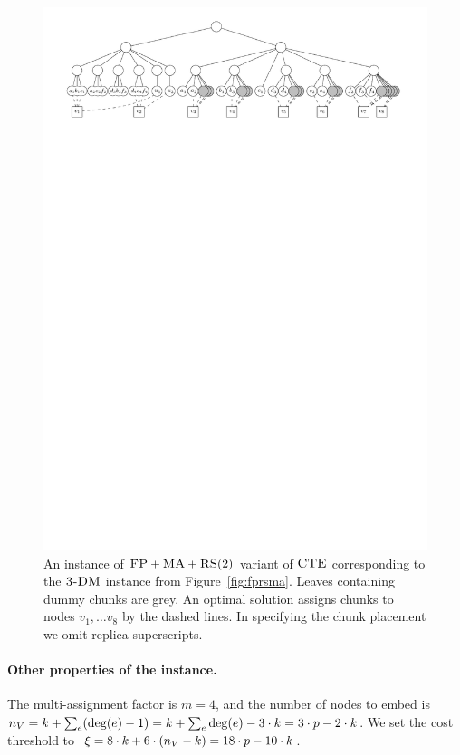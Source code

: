 \begin{figure}[t]
\centering
\includegraphics[width=1\columnwidth]{figs/static-mapping/cte-ma2.pdf}
\caption{An instance of $\textsc{FP}+\textsc{MA}+\textsc{RS}(2)$ variant of $\textsc{CTE}$ corresponding to the $\textsc{3-DM}$ instance from Figure~\ref{fig:fprsma}. Leaves containing dummy chunks are grey. An optimal solution assigns chunks to nodes $v_1, \ldots v_8$ by the dashed lines. In specifying the chunk placement we omit replica superscripts.}
\label{fig:example-rs2}
\end{figure}


\paragraph{Other properties of the instance.}
The multi-assignment factor is $m=4$, and the number of nodes to embed is~$n_V = k + \sum_{e}(\deg(e)-1) = k + \sum_{e}\deg(e)-3\cdot k = 3\cdot p - 2\cdot k$.
 We set the cost threshold to~$\xi = 8\cdot k + 6\cdot(n_V-k) = 18\cdot p - 10\cdot k$.

